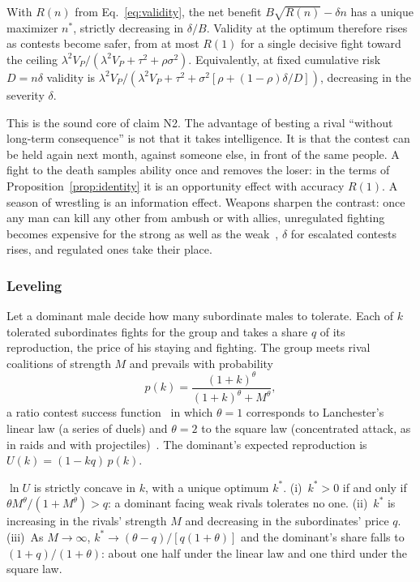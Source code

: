\begin{proposition}\label{prop:repeat}
With $R(n)$ from Eq.~\eqref{eq:validity}, the net benefit $B\sqrt{R(n)}-\delta n$ has a unique maximizer $n^*$, strictly
decreasing in $\delta/B$. Validity at the optimum therefore rises as contests become safer, from at most $R(1)$ for a single
decisive fight toward the ceiling $\lambda^2V_P/(\lambda^2V_P+\tau^2+\rho\sigma^2)$. Equivalently, at fixed cumulative risk
$D=n\delta$ validity is $\lambda^2V_P/(\lambda^2V_P+\tau^2+\sigma^2[\rho+(1-\rho)\delta/D])$, decreasing in the severity
$\delta$.
\end{proposition}

This is the sound core of claim N2. The advantage of besting a rival ``without long-term consequence'' is not that it takes
intelligence. It is that the contest can be held again next month, against someone else, in front of the same people. A
fight to the death samples ability once and removes the loser: in the terms of Proposition~\ref{prop:identity} it is an
opportunity effect with accuracy $R(1)$. A season of wrestling is an information effect. Weapons sharpen the contrast: once
any man can kill any other from ambush or with allies, unregulated fighting becomes expensive for the strong as well as the
weak~\cite{wrangham2018,gintis2015}, $\delta$ for escalated contests rises, and regulated ones take their place.

\subsubsection{Leveling} Let a dominant male decide how many subordinate males to tolerate. Each of $k$ tolerated
subordinates fights for the group and takes a share $q$ of its reproduction, the price of his staying and fighting. The
group meets rival coalitions of strength $M$ and prevails with probability
\begin{equation}
p(k)=\frac{(1+k)^\theta}{(1+k)^\theta+M^\theta},\label{eq:csf}
\end{equation}
a ratio contest success function~\cite{hirshleifer1989} in which $\theta=1$ corresponds to Lanchester's linear law (a series
of duels) and $\theta=2$ to the square law (concentrated attack, as in raids and with
projectiles)~\cite{johnson2015,wilson2002}. The dominant's expected reproduction is $U(k)=(1-kq)\,p(k)$.

\begin{proposition}\label{prop:despot}
$\ln U$ is strictly concave in $k$, with a unique optimum $k^*$. (i)~$k^*>0$ if and only if\/
$\theta M^\theta/(1+M^\theta)>q$: a dominant facing weak rivals tolerates no one. (ii)~$k^*$ is increasing in the rivals'
strength $M$ and decreasing in the subordinates' price $q$. (iii)~As $M\to\infty$, $k^*\to(\theta-q)/[q(1+\theta)]$ and the
dominant's share falls to $(1+q)/(1+\theta)$: about one half under the linear law and one third under the square law.
\end{proposition}

